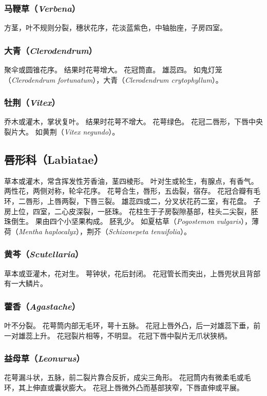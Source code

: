 \documentclass[11pt]{article}
\begin{document}
\begin{sloppypar}
\subsubsection{马鞭草（\textit{Verbena}）}
方茎，叶不规则分裂，穗状花序，花淡蓝紫色，中轴胎座，子房四室。

\subsubsection{大青（\textit{Clerodendrum}）}
聚伞或圆锥花序。
结果时花萼增大。
花冠筒直。
雄蕊四。
如鬼灯笼（\textit{Clerodendrum fortunatum}），大青（\textit{Clerodendrum crytophyllum}）。

\subsubsection{牡荆（\textit{Vitex}）}
乔木或灌木，掌状复叶。
结果时花萼不增大。
花萼绿色。
花冠二唇形，下唇中央裂片大。
如黄荆（\textit{Vitex negundo}）。

\subsection{唇形科（Labiatae）}
草本或灌木，常含挥发性芳香油，茎四棱形。
叶对生或轮生，有腺点，有香气。
两性花，两侧对称，轮伞花序。
花萼合生，唇形，五齿裂，宿存。
花冠合瓣有毛环，二唇形，上唇两裂，下唇三裂。
雄蕊四或二，分叉状花药二室，有花盘。
子房上位，四室，二心皮深裂，一胚珠。
花柱生于子房裂隙基部，柱头二尖裂，胚珠倒生。
果由四个小坚果构成。
胚乳少。
如夏枯草（\textit{Pogostemon vulgaris}），薄荷（\textit{Mentha haplocalyx}），荆芥（\textit{Schizonepeta tenuifolia}）。

\subsubsection{黄芩（\textit{Scutellaria}）}
草本或亚灌木，花对生。
萼钟状，花后封闭。
花冠管长而突出，上唇兜状且背部有一大鳞片。

\subsubsection{藿香（\textit{Agastache}）}
叶不分裂。
花萼筒内部无毛环，萼十五脉。
花冠上唇外凸，后一对雄蕊下垂，前一对雄蕊上升。
花冠裂片相等，不明显。
花冠下唇中裂片无爪状狭柄。

\subsubsection{益母草（\textit{Leonurus}）}
花萼漏斗状，五脉，前二裂片靠合反折，成尖三角形。
花冠筒内有微柔毛或毛环，其上伸直或囊状膨大。
花冠上唇微外凸而基部狭窄，下唇直伸或平展。


\end{sloppypar}
\end{document}
